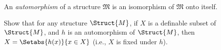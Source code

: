 \documentclass[../../include/open-logic-section]{subfiles}
\begin{document}
\begin{defn}
An \emph{automorphism} of a structure $\mathfrak{M}$ is an isomorphism
of $\mathfrak{M}$ onto itself.
\end{defn}

\begin{prob}
Show that for any structure $\Struct{M}$, if $X$ is a definable subset
of $\Struct{M}$, and $h$ is an automorphism of $\Struct{M}$, then $X
=\Setabs{h(x)}{x \in X}$ (i.e., $X$ is fixed under $h$).
\end{prob}
\end{document}
